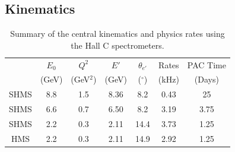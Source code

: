 \subsection{Kinematics}
\label{kinematics}
\begin{table}
\begin{center}

\begin{tabular}{c|c|c|c|c|c|c}
& $E_0$ & $Q^2$    	& $E'$  &    $\theta_{e'}$  &  Rates   & PAC Time   \\
& (GeV) & (GeV$^2$)  & (GeV)  &     ($^{\circ}$)   &   (kHz)  & (Days) \\
\hline\hline
SHMS & 8.8	&  1.5	&  8.36	&    8.2 	&    0.43	&   25 \\
SHMS & 6.6	&  0.7	&  6.50	&    8.2 	&    3.19	&   3.75 \\
SHMS & 2.2	&  0.3	&  2.11	&    14.4 	&    3.73	&   1.25 \\
HMS  & 2.2	&  0.3	&  2.11	&    14.9	&    2.92	&   1.25 \\  


\hline\hline
\end{tabular}
\caption{\label{RATES1}Summary of the central kinematics and physics rates using the Hall C  spectrometers.}
\end{center}
\end{table}



